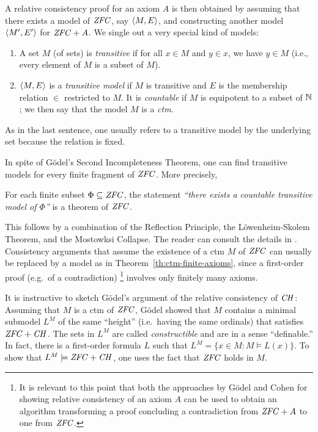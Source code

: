 A relative consistency proof for an axiom $A$ is then obtained by
assuming that there exists a model of $\mathit{ZFC}$, say $\langle M,E\rangle$, and
constructing another model $\langle M',E'\rangle$ for $\mathit{ZFC} + A$. We single
out a very special kind of models:
%
\begin{definition}\label{def:transitive-model}
  \begin{enumerate}
  \item A set $M$ (of sets) is \emph{transitive} if for all $x\in M$ and 
    $y\in x$, we have $y\in M$ (i.e., every element of $M$ is a subset
    of $M$).
  \item $\langle M,E\rangle$ is a \emph{transitive model} if $M$ is transitive
     and  $E$ is the membership relation $\in$ restricted to
    $M$. It is \emph{countable} if $M$ is equipotent to a subset of
    $\mathbb{N}$; we then say that the model  $M$ is a \emph{ctm}. 
  \end{enumerate}
\end{definition}
%
\noindent As in the last sentence, one usually refers to a transitive
model by the underlying set because the relation is fixed.

In spite of G\"odel's Second Incompleteness Theorem, one can find
transitive models for every finite fragment of $\mathit{ZFC}$. More precisely,
%
\begin{theorem}\label{th:ctm-finite-axioms}
  For each finite subset
  $\Phi\subseteq \mathit{ZFC}$, the statement \emph{``there exists a countable
    transitive model of $\Phi$''} is a theorem of $\mathit{ZFC}$.
\end{theorem}
%
\noindent This follows by a combination of the Reflection Principle, the
L\"owenheim-Skolem Theorem, and the Mostowksi Collapse. The reader can
consult the details in \cite{kunen2011set}. Consistency arguments that
assume the existence of a ctm $M$ of $\mathit{ZFC}$ can usually be replaced by
a model as in Theorem~\ref{th:ctm-finite-axioms}, since a first-order
proof (e.g.\ of a contradiction)%
\footnote{It is relevant to this point that 
  both the approaches by G\"odel and Cohen for showing
  relative consistency of an axiom $A$ 
  can be used to obtain an algorithm transforming a proof
  concluding a contradiction from $\mathit{ZFC}+A$ to one from $\mathit{ZFC}$.}
involves only finitely many axioms.

It is instructive to sketch G\"odel's argument of the relative
consistency of $\mathit{CH}$: Assuming that $M$ is a ctm of $\mathit{ZFC}$, G\"odel
showed that $M$ contains a minimal submodel $L^M$ of the same
``height'' (i.e.\ having the same ordinals) that satisfies
$\mathit{ZFC}+\mathit{CH}$. The sets in $L^M$ are called \emph{constructible} and are
in a sense ``definable.'' In fact, there is a first-order formula $L$
such that $L^M = \{x\in M : M\models L(x)\}$. To show that
$L^M\models \mathit{ZFC}+\mathit{CH}$, one uses the fact that $\mathit{ZFC}$ holds in $M$.

